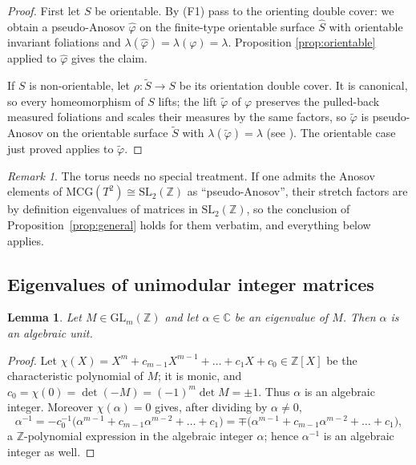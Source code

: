 \documentclass[11pt]{article}
\theoremstyle{plain}
\newtheorem{lemma}[theorem]{Lemma}
\theoremstyle{definition}
\theoremstyle{remark}
\newtheorem{remark}[theorem]{Remark}
\newcommand{\ZZ}{\mathbb{Z}}
\newcommand{\CC}{\mathbb{C}}
\begin{document}
\begin{proof}
First let $S$ be orientable. By (F1) pass to the orienting double cover: we obtain
a pseudo-Anosov $\widehat\varphi$ on the finite-type orientable surface $\widehat
S$ with orientable invariant foliations and
$\lambda(\widehat\varphi)=\lambda(\varphi)=\lambda$. Proposition
\ref{prop:orientable} applied to $\widehat\varphi$ gives the claim.

If $S$ is non-orientable, let $\rho\colon\widetilde S\to S$ be its orientation
double cover. It is canonical, so every homeomorphism of $S$ lifts; the lift
$\widetilde\varphi$ of $\varphi$ preserves the pulled-back measured foliations and
scales their measures by the same factors, so $\widetilde\varphi$ is
pseudo-Anosov on the orientable surface $\widetilde S$ with
$\lambda(\widetilde\varphi)=\lambda$ (see \cite{Strenner}). The orientable case
just proved applies to $\widetilde\varphi$.
\end{proof}

\begin{remark}
The torus needs no special treatment. If one admits the Anosov elements of
$\mathrm{MCG}(T^{2})\cong\mathrm{SL}_{2}(\ZZ)$ as ``pseudo-Anosov'', their stretch
factors are by definition eigenvalues of matrices in $\mathrm{SL}_{2}(\ZZ)$, so the
conclusion of Proposition~\ref{prop:general} holds for them verbatim, and
everything below applies.
\end{remark}

\subsection{Eigenvalues of unimodular integer matrices}

\begin{lemma}\label{lem:unit}
Let $M\in\mathrm{GL}_{m}(\ZZ)$ and let $\alpha\in\CC$ be an eigenvalue of $M$.
Then $\alpha$ is an algebraic unit.
\end{lemma}

\begin{proof}
Let $\chi(X)=X^{m}+c_{m-1}X^{m-1}+\dots+c_{1}X+c_{0}\in\ZZ[X]$ be the
characteristic polynomial of $M$; it is monic, and
$c_{0}=\chi(0)=\det(-M)=(-1)^{m}\det M=\pm1$. Thus $\alpha$ is an algebraic
integer. Moreover $\chi(\alpha)=0$ gives, after dividing by $\alpha\ne0$,
\[
  \alpha^{-1}
  =-c_{0}^{-1}\bigl(\alpha^{m-1}+c_{m-1}\alpha^{m-2}+\dots+c_{1}\bigr)
  =\mp\bigl(\alpha^{m-1}+c_{m-1}\alpha^{m-2}+\dots+c_{1}\bigr),
\]
a $\ZZ$-polynomial expression in the algebraic integer $\alpha$; hence
$\alpha^{-1}$ is an algebraic integer as well.
\end{proof}
\end{document}
